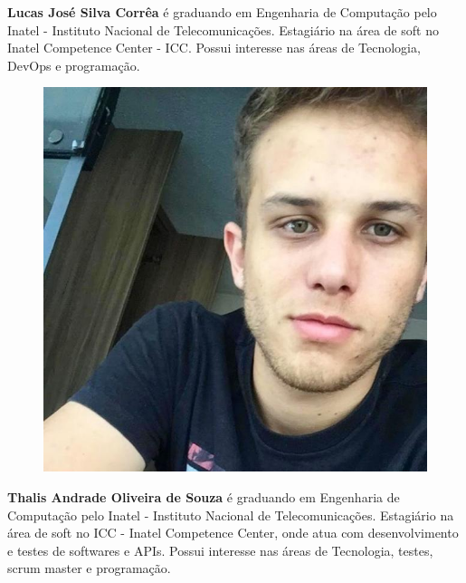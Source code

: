 \textbf{Lucas José Silva Corrêa} é graduando em Engenharia de Computação pelo Inatel - Instituto Nacional de Telecomunicações. Estagiário na área de soft no Inatel Competence Center - ICC. Possui interesse nas áreas de Tecnologia, DevOps e programação.\newline

\begin{figure}
\includegraphics[width=\linewidth]{figuras/autor_thalis.jpg}
\end{figure}

\textbf{Thalis Andrade Oliveira de Souza} é graduando em Engenharia de Computação pelo Inatel - Instituto Nacional de Telecomunicações. Estagiário na área de soft no ICC -  Inatel Competence Center, onde atua com desenvolvimento e testes de softwares e APIs. Possui interesse nas áreas de Tecnologia, testes, scrum master e programação.\newline

